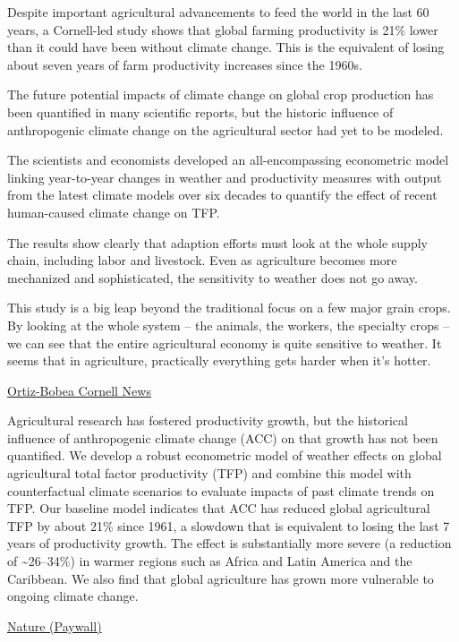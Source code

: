\documentclass[
]{book}
\begin{document}
Despite important agricultural advancements to feed the world in the last 60 years, a Cornell-led study shows that global farming productivity is 21\% lower than it could have been without climate change. This is the equivalent of losing about seven years of farm productivity increases since the 1960s.

The future potential impacts of climate change on global crop production has been quantified in many scientific reports, but the historic influence of anthropogenic climate change on the agricultural sector had yet to be modeled.

The scientists and economists developed an all-encompassing econometric model linking year-to-year changes in weather and productivity measures with output from the latest climate models over six decades to quantify the effect of recent human-caused climate change on TFP.

The results show clearly that adaption efforts must look at the whole supply chain, including labor and livestock.
Even as agriculture becomes more mechanized and sophisticated, the sensitivity to weather does not go away.

This study is a big leap beyond the traditional focus on a few major grain crops.
By looking at the whole system -- the animals, the workers, the specialty crops -- we can see that the entire agricultural economy is quite sensitive to weather. It seems that in agriculture, practically everything gets harder when it's hotter.

\href{https://news.cornell.edu/stories/2021/04/climate-change-has-cost-7-years-ag-productivity-growth}{Ortiz-Bobea Cornell News}

Agricultural research has fostered productivity growth, but the historical influence of anthropogenic climate change (ACC) on that growth has not been quantified. We develop a robust econometric model of weather effects on global agricultural total factor productivity (TFP) and combine this model with counterfactual climate scenarios to evaluate impacts of past climate trends on TFP. Our baseline model indicates that ACC has reduced global agricultural TFP by about 21\% since 1961, a slowdown that is equivalent to losing the last 7 years of productivity growth. The effect is substantially more severe (a reduction of \textasciitilde26--34\%) in warmer regions such as Africa and Latin America and the Caribbean. We also find that global agriculture has grown more vulnerable to ongoing climate change.

\href{https://www.nature.com/articles/s41558-021-01000-1}{Nature (Paywall)}
\end{document}

